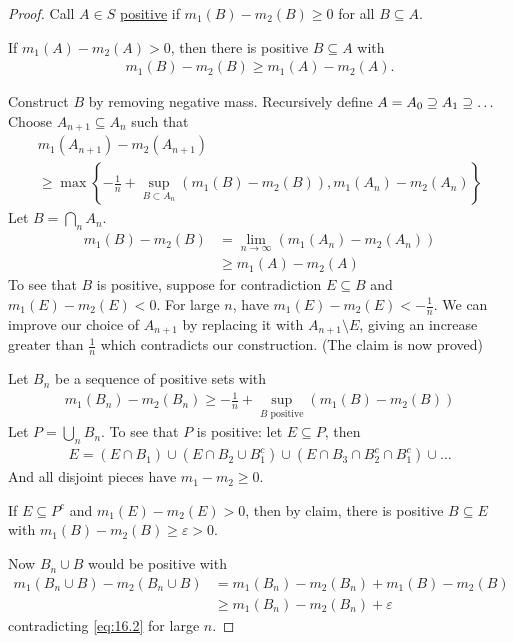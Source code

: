 \begin{proof}
	Call $A \in S$ \underline{positive} if $m_1 (B) - m_2 (B) \geq 0$ for all $B \subseteq A$.

	 \begin{claim}
		 If $m_1 (A) - m_{2} (A) > 0$, then there is positive $B \subseteq A$ with
		 \begin{align*}
			 m_{1} (B) - m_{2} (B) \geq m_1 (A) - m_2 (A).
		 \end{align*}
	\end{claim}
	\noindent Construct $B$ by removing negative mass. Recursively define $A = A_{0} \supseteq A_1 \supseteq \ldots$
	Choose $A_{n+1} \subseteq A_{n}$ such that
	\begin{multline*}
		m_{1} (A_{n+1}) - m_{2} (A_{n+1}) \\
		\geq \max \left\{-\frac{1}{n} + \sup_{B \subset A_n} \left(m_1(B) - m_2(B) \right), m_1(A_n) - m_2(A_n) \right\}
	\end{multline*}
	Let $B = \bigcap_{n} A_{n}$.
	\begin{align*}
		m_{1} (B) - m_{2} (B) &= \lim_{n \to \infty} (m_{1} (A_{n}) - m_{2} (A_{n})) \\
								&\geq m_{1} (A) - m_{2} (A)
	\end{align*}
	To see that $B$ is positive, suppose for contradiction $E \subseteq B$ and $m_{1} (E) - m_{2} (E) < 0$.
	For large $n$, have $m_1 (E) - m_{2} (E) < -\frac{1}{n}$.
	We can improve our choice of $A_{n +1}$ by replacing it with $A_{n +1 } \setminus E$, giving an increase greater than $\frac{1}{n}$ which contradicts our construction.
	(The claim is now proved)

	Let $B_{n}$ be a sequence of positive sets with
	\begin{align}\label{eq:16.2}
		m_{1} (B_{n}) - m_{2} (B_{n}) \geq -\frac{1}{n} + \sup_{B \text{ positive}} (m_{1} (B) - m_{2} (B))
	\end{align}
	Let $P = \bigcup_{n} B_{n}$. To see that $P$ is positive: let $E \subseteq P$, then
	\begin{align*}
		E = ( E \cap B_{1} ) \cup ( E \cap B_{2} \cup B_{1}^c) \cup ( E \cap B_{3} \cap B_{2}^{c} \cap B_{1}^c ) \cup \ldots
	\end{align*}
	And all disjoint pieces have $m_{1} - m_{2} \geq 0$.

	If $E \subseteq P^c$ and $m_{1} (E) - m_{2} (E) > 0$, then by claim, there is positive $B \subseteq E$
	with $m_{1} (B) - m_{2} (B) \geq \varepsilon > 0$.

	Now $B_{n} \cup B$ would be positive with
	\begin{align*}
		m_{1} (B_{n} \cup B) - m_{2} (B_{n} \cup B) &= m_{1} (B_{n}) - m_{2} (B_{n} ) + m_{1} (B) - m_{2} (B) \\
													&\geq m_{1} (B_{n}) - m_{2} (B_{n} ) + \varepsilon
	\end{align*}
	contradicting \ref{eq:16.2} for large $n$.
\end{proof}

